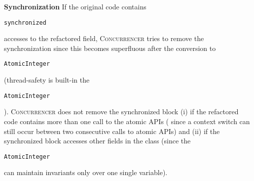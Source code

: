 \documentclass[10pt,preprint]{sigplanconf}
\newcommand\tool{{\smaller\textsc{Concurrencer}}\xspace}
\newcommand{\Comment}[1]{}
\newcommand{\code}[1]{\begin{small}\texttt{#1}\end{small}}
\newcommand{\myParagraph}[1]{\textbf{#1}}
\begin{document}
\myParagraph{Synchronization}
If the original code contains \code{synchronized} accesses to the
refactored field, \tool tries to remove the synchronization since this becomes
superfluous after the conversion to \code{AtomicInteger} (thread-safety is
built-in the \code{AtomicInteger}). \tool does not remove the synchronized block
(i) if the refactored code contains more than one call to the atomic APIs (
since a context switch can still occur between two consecutive calls to atomic
APIs) and (ii) if the synchronized block accesses other fields in
the class (since the \code{AtomicInteger} can maintain invariants only over one
single variable).

\Comment{Here we presented the most relevant transformations. \tool applies other
transformations (e.g., for different kinds of expression operators) similar in
spirit with the ones presented.}



\end{document}
